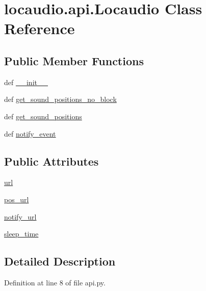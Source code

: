 \hypertarget{classlocaudio_1_1api_1_1Locaudio}{\section{locaudio.\-api.\-Locaudio Class Reference}
\label{classlocaudio_1_1api_1_1Locaudio}
}
\subsection*{Public Member Functions}
\begin{DoxyCompactItemize}
\item 
def \hyperlink{classlocaudio_1_1api_1_1Locaudio_ab2d3bb5e705cb658077710485818b5f3}{\-\_\-\-\_\-init\-\_\-\-\_\-}
\item 
def \hyperlink{classlocaudio_1_1api_1_1Locaudio_a6b844b620c519b5b1726a271d004e92c}{get\-\_\-sound\-\_\-positions\-\_\-no\-\_\-block}
\item 
def \hyperlink{classlocaudio_1_1api_1_1Locaudio_a08eef102407125b656e6043c3bbfb756}{get\-\_\-sound\-\_\-positions}
\item 
def \hyperlink{classlocaudio_1_1api_1_1Locaudio_a463c89369ac3d0ccf2551c32a9b5ee91}{notify\-\_\-event}
\end{DoxyCompactItemize}
\subsection*{Public Attributes}
\begin{DoxyCompactItemize}
\item 
\hyperlink{classlocaudio_1_1api_1_1Locaudio_a97b12a0e2f549ea2d080e53d56609dfa}{url}
\item 
\hyperlink{classlocaudio_1_1api_1_1Locaudio_a36f2ab54cdc3581dc6f37d0731729b96}{pos\-\_\-url}
\item 
\hyperlink{classlocaudio_1_1api_1_1Locaudio_a6bf069251731e91dd2bdd291787b3e17}{notify\-\_\-url}
\item 
\hyperlink{classlocaudio_1_1api_1_1Locaudio_a0b5d0065ae0183383514e0ba1ed1858f}{sleep\-\_\-time}
\end{DoxyCompactItemize}


\subsection{Detailed Description}


Definition at line 8 of file api.\-py.



